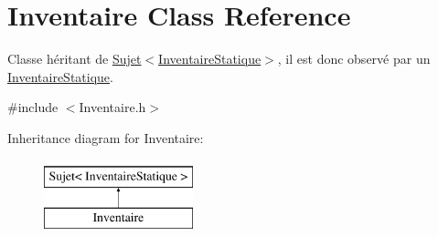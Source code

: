 \hypertarget{classInventaire}{\section{Inventaire Class Reference}
\label{classInventaire}
}


Classe héritant de \hyperlink{classSujet}{Sujet$<$\-Inventaire\-Statique$>$}, il est donc observé par un \hyperlink{classInventaireStatique}{Inventaire\-Statique}.  




{\ttfamily \#include $<$Inventaire.\-h$>$}

Inheritance diagram for Inventaire\-:\begin{figure}[H]
\begin{center}
\leavevmode
\includegraphics[height=2.000000cm]{classInventaire}
\end{center}
\end{figure}
